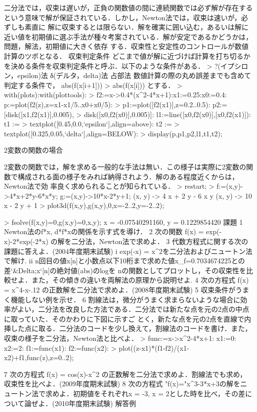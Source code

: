 二分法では，収束は遅いが，正負の関数値の間に連続関数では必ず解が存在するという意味で解が保証されている．しかし，Newton法では，収束は速いが，必ずしも素直に
解に収束するとは限らない．解を確実に囲い込む，あるいは解に近い値を初期値に選ぶ手法が種々考案されている．解が安定であるかどうかは，問題，解法，初期値に大きく依存
する．収束性と安定性のコントロールが数値計算のツボとなる．
収束判定条件
どこまで値が解に近づけば計算を打ち切るかを決める条件を収束判定条件と呼ぶ．以下のような条件がある．
> ?(イプシロン，epsilon)法 δ(デルタ，delta)法
占部法
数値計算の際の丸め誤差までも含めて判定する条件で，
abs(f(x[i+1])) > abs(f(x[i]))
とする．
> with(plots):with(plottools):
> f2:=x->0.4*(x^2-4*x+1):x1:=0.25:x0:=0.4: p:=plot(f2(z),z=x1-x1/5..x0+x0/5):
> p1:=plot([f2(x1)],z=0.2..0.5): p2:=[disk([x1,f2(x1)],0.005),
> disk([x0,f2(x0)],0.005)]: l1:=line([x0,f2(x0)],[x0,f2(x1)]): t1 :=
> textplot([0.45,0.0,`epsilon`],align=above): t2 :=
> textplot([0.325,0.05,`delta`],align=BELOW):
> display(p,p1,p2,l1,t1,t2);

2変数の関数の場合

2変数の関数では，解を求める一般的な手法は無い．この様子は実際に2変数の関数で構成される面の様子をみれば納得されよう．解のある程度近くからは，Newton法で効
率良く求められることが知られている．
> restart;
> f:=(x,y)->4*x+2*y-6*x*y; g:=(x,y)->10*x-2*y+1;
(x, y) -> 4 x + 2 y - 6 x y
(x, y) -> 10 x - 2 y + 1
> plot3d({f(x,y),g(x,y),0},x=-2..2,y=-2..2);

> fsolve({f(x,y)=0,g(x,y)=0},{x,y});
                    {x = -0.07540291160, y = 0.1229854420}
課題
1 Newton法のf*x, d*f*xの関係を示す式を導け．
2 次の関数 f(x) = exp(-x)-2*exp(-2*x) の解を二分法，Newton法で求めよ．
3 代数方程式に関する次の課題に答えよ．(2004年度期末試験)
       i exp(-x) = x^2を二分法およびニュートン法で解け.
       ii 
          n回目の値x[n]と小数点以下10桁まで求めた値x_f=0.7034674225との差`&Delta;x`[n]の絶対値(abs)のlogを
          nの関数としてプロットし，その収束性を比較せよ．また，その傾きの違いを両解法の原理から説明せよ.
4 次の方程式 f(x) = x^4-x-.12 の正数解を二分法で求めよ．(2008年度期末試験)
5 収束条件がうまく機能しない例を示せ．
6 
  割線法は，微分がうまく求まらないような場合に効率がよい，二分法を改良した方法である．二分法では新たな点を元の2点の中点に取っていた．そのかわりに下図に示すご
  とく，新たな点を元の2点を直線で内挿した点に取る．二分法のコードを少し換えて，割線法のコードを書け．また，収束の様子を二分法，Newton法と比べよ．
> func:=x->x^2-4*x+1: x1:=0: x2:=2: f1:=func(x1): f2:=func(x2):
> plot({(z-x1)*(f1-f2)/(x1-x2)+f1,func(z)},z=0..2);

7 次の方程式 f(x) = cos(x)-x^2 の正数解を二分法で求めよ．割線法でも求め，収束性を比べよ．(2009年度期末試験)
8 次の方程式 "f(x)="x^3-3*x+3の解をニュートン法で求めよ．初期値をそれぞれx = -3, x =
  2とした時を比べ，その差について論ぜよ．(2010年度期末試験)
解答例
